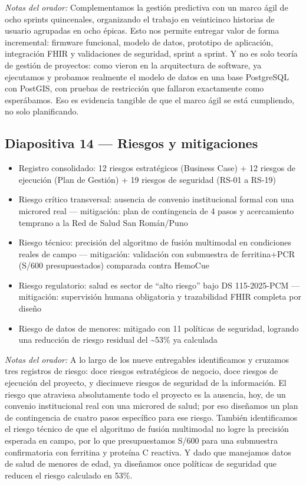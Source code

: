 \documentclass[11pt,a4paper]{article}
\providecommand{\tightlist}{%
  \setlength{\itemsep}{0pt}\setlength{\parskip}{0pt}}
\begin{document}
\emph{Notas del orador:} Complementamos la gestión predictiva con un marco ágil de ocho sprints quincenales, organizando el trabajo en veinticinco historias de usuario agrupadas en ocho épicas. Esto nos permite entregar valor de forma incremental: firmware funcional, modelo de datos, prototipo de aplicación, integración FHIR y validaciones de seguridad, sprint a sprint. Y no es solo teoría de gestión de proyectos: como vieron en la arquitectura de software, ya ejecutamos y probamos realmente el modelo de datos en una base PostgreSQL con PostGIS, con pruebas de restricción que fallaron exactamente como esperábamos. Eso es evidencia tangible de que el marco ágil se está cumpliendo, no solo planificando.

\subsection{Diapositiva 14 --- Riesgos y mitigaciones}\label{diapositiva-14-riesgos-y-mitigaciones}

\begin{itemize}
\tightlist
\item
  Registro consolidado: 12 riesgos estratégicos (Business Case) + 12 riesgos de ejecución (Plan de Gestión) + 19 riesgos de seguridad (RS-01 a RS-19)
\item
  Riesgo crítico transversal: ausencia de convenio institucional formal con una microred real --- mitigación: plan de contingencia de 4 pasos y acercamiento temprano a la Red de Salud San Román/Puno
\item
  Riesgo técnico: precisión del algoritmo de fusión multimodal en condiciones reales de campo --- mitigación: validación con submuestra de ferritina+PCR (S/600 presupuestados) comparada contra HemoCue
\item
  Riesgo regulatorio: salud es sector de ``alto riesgo'' bajo DS 115-2025-PCM --- mitigación: supervisión humana obligatoria y trazabilidad FHIR completa por diseño
\item
  Riesgo de datos de menores: mitigado con 11 políticas de seguridad, logrando una reducción de riesgo residual del \textasciitilde53\% ya calculada
\end{itemize}

\emph{Notas del orador:} A lo largo de los nueve entregables identificamos y cruzamos tres registros de riesgo: doce riesgos estratégicos de negocio, doce riesgos de ejecución del proyecto, y diecinueve riesgos de seguridad de la información. El riesgo que atraviesa absolutamente todo el proyecto es la ausencia, hoy, de un convenio institucional real con una microred de salud; por eso diseñamos un plan de contingencia de cuatro pasos específico para ese riesgo. También identificamos el riesgo técnico de que el algoritmo de fusión multimodal no logre la precisión esperada en campo, por lo que presupuestamos S/600 para una submuestra confirmatoria con ferritina y proteína C reactiva. Y dado que manejamos datos de salud de menores de edad, ya diseñamos once políticas de seguridad que reducen el riesgo calculado en 53\%.
\end{document}
